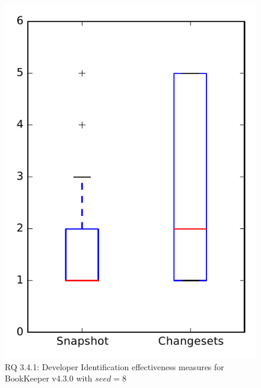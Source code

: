 
\begin{figure}
\centering
\includegraphics[height=0.4\textheight]{figures/dit_seed/rq1_bookkeeper_8}
\caption{RQ 3.4.1: Developer Identification effectiveness measures for BookKeeper v4.3.0 with $seed=8$}
\label{fig:dit_seed:rq1:bookkeeper}
\end{figure}
